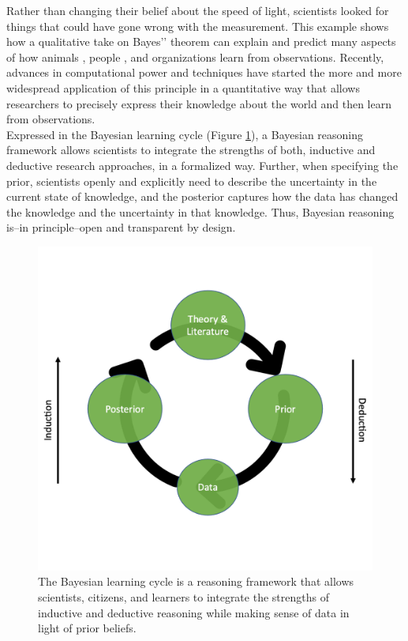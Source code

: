 \documentclass[man, floatsintext]{apa7} %
\begin{document}
Rather than changing their belief about the speed of light, scientists looked for things that could have gone wrong with the measurement. This example shows how a qualitative take on Bayes'’ theorem can explain and predict many aspects of how animals \parencite{o13}, people \parencite{tgk06}, and organizations \parencite{kaj12} learn from observations. Recently, advances in computational power and techniques have started the more and more widespread application of this principle in a quantitative way that allows researchers to precisely express their knowledge about the world and then learn from observations. \\

Expressed in the Bayesian learning cycle (Figure \ref{fig:The Bayesian Learning Cycle}), a Bayesian reasoning framework allows scientists to integrate the strengths of both, inductive and deductive research approaches, in a formalized way. Further, when specifying the prior, scientists openly and explicitly need to describe the uncertainty in the current state of knowledge, and the posterior captures how the data has changed the knowledge and the uncertainty in that knowledge. Thus, Bayesian reasoning is--in principle--open and transparent by design. \\

\begin{figure}[h]
\begin{center}
\includegraphics[width = .65\paperwidth]{learning.png}
\caption{The Bayesian learning cycle is a reasoning framework that allows scientists, citizens, and learners to integrate the strengths of inductive and deductive reasoning while making sense of data in light of prior beliefs.}
\label{fig:The Bayesian Learning Cycle}
\end{center}
\end{figure}
\end{document}
